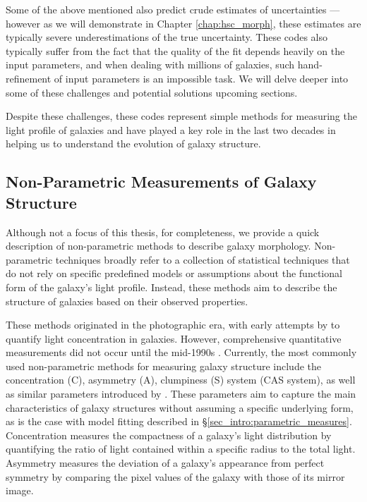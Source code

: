 Some of the above mentioned also predict crude estimates of uncertainties --- however as we will demonstrate in Chapter \ref{chap:hsc_morph}, these estimates are typically severe underestimations of the true uncertainty. These codes also typically suffer from the fact that the quality of the fit depends heavily on the input parameters, and when dealing with millions of galaxies, such hand-refinement of input parameters is an impossible task. We will delve deeper into some of these challenges and potential solutions upcoming sections. 

Despite these challenges, these codes represent simple methods for measuring the light profile of galaxies and have played a key role in the last two decades in helping us to understand the evolution of galaxy structure.

\subsection{Non-Parametric Measurements of Galaxy Structure} \label{sec_intro:non_parametric_measures}

Although not a focus of this thesis, for completeness, we provide a quick description of non-parametric methods to describe galaxy morphology. Non-parametric techniques broadly refer to a collection of statistical techniques that do not rely on specific predefined models or assumptions about the functional form of the galaxy's light profile. Instead, these methods aim to describe the structure of galaxies based on their observed properties.

These methods  originated in the photographic era, with early attempts by \citet{morgan_62} to quantify light concentration in galaxies. However, comprehensive quantitative measurements did not occur until the mid-1990s \citep{rix_95,conselice_97}. Currently, the most commonly used non-parametric methods for measuring galaxy structure include the concentration (C), asymmetry (A), clumpiness (S) system (CAS system), as well as similar parameters introduced by \citet{takamiya_99, papovich_03, abraham_03, lotz_04}. These parameters aim to capture the main characteristics of galaxy structures without assuming a specific underlying form, as is the case with model fitting described in \S \ref{sec_intro:parametric_measures}. Concentration measures the compactness of a galaxy's light distribution by quantifying the ratio of light contained within a specific radius to the total light. Asymmetry measures the deviation of a galaxy's appearance from perfect symmetry by comparing the pixel values of the galaxy with those of its mirror image.

